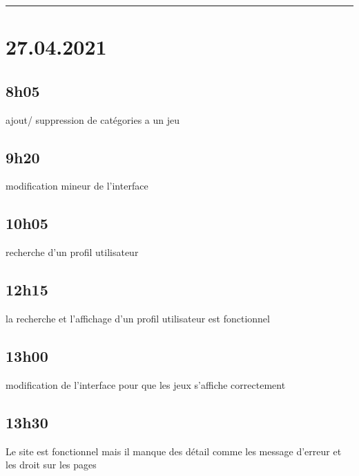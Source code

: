 \documentclass[a4paper,12pt,french]{sphinxmanual}
\begin{document}
\bigskip\hrule\bigskip



\section{27.04.2021}
\label{\detokenize{logbook:id34}}

\subsection{8h05}
\label{\detokenize{logbook:id35}}
\sphinxAtStartPar
ajout/ suppression de catégories a un jeu


\subsection{9h20}
\label{\detokenize{logbook:id36}}
\sphinxAtStartPar
modification mineur de l’interface


\subsection{10h05}
\label{\detokenize{logbook:id37}}
\sphinxAtStartPar
recherche d’un profil utilisateur


\subsection{12h15}
\label{\detokenize{logbook:h15}}
\sphinxAtStartPar
la recherche et l’affichage d’un profil utilisateur est fonctionnel


\subsection{13h00}
\label{\detokenize{logbook:id38}}
\sphinxAtStartPar
modification de l’interface pour que les jeux s’affiche correctement


\subsection{13h30}
\label{\detokenize{logbook:id39}}
\sphinxAtStartPar
Le site est fonctionnel mais il manque des détail comme les message d’erreur et les droit sur les pages
\end{document}
